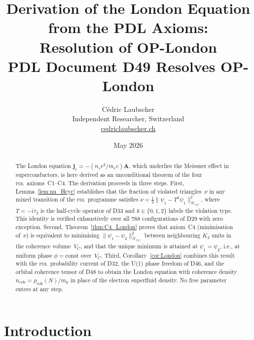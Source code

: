\documentclass[12pt,a4paper]{article}
\newcommand{\Kfour}{K_4}
\newcommand{\PDL}{\textsc{pdl}}
\newcommand{\rhocoh}{\rho_{\mathrm{coh}}}
\newcommand{\Hcyc}{\mathcal{H}_{\mathrm{cyc}}}
\newcommand{\VC}{V_C}
\newcommand{\ncoh}{n_{\mathrm{coh}}}
\newcommand{\jsvec}{\mathbf{j}_s}
\newcommand{\Avec}{\mathbf{A}}
\begin{document}
\title{\textbf{Derivation of the London Equation from the PDL Axioms:\\
Resolution of OP-London}\\[6pt]
{\large PDL Document D49 \textemdash{} Resolves OP-London}}

\author{C\'edric Laubscher\\[4pt]
\small Independent Researcher, Switzerland\\
\small \href{https://cedriclaubscher.ch}{cedriclaubscher.ch}}

\date{May 2026}

\maketitle

\begin{abstract}
The London equation $\jsvec = -(n_s e^2/m_e c)\Avec$, which underlies the Meissner effect in superconductors, is here derived as an unconditional theorem of the four \PDL\ axioms~C1--C4. The derivation proceeds in three steps. First, Lemma~\ref{lem:nu_Hcyc} establishes that the fraction of violated triangles~$\nu$ in any mixed transition of the \PDL\ programme satisfies $\nu = \tfrac{1}{4}\|\psi_1 - T^k\psi_1\|^2_{\Hcyc}$, where $T = -i\tau_2$ is the half-cycle operator of D33 and $k \in \{0,1,2\}$ labels the violation type. This identity is verified exhaustively over all 768 configurations of D29 with zero exception. Second, Theorem~\ref{thm:C4_London} proves that axiom~C4 (minimisation of~$\nu$) is equivalent to minimising $\|\psi_1 - \psi_2\|^2_{\Hcyc}$ between neighbouring $\Kfour{}$ units in the coherence volume~$\VC$, and that the unique minimum is attained at $\psi_1 = \psi_2$, i.e., at uniform phase $\phi = \mathrm{const}$ over~$\VC$. Third, Corollary~\ref{cor:London} combines this result with the \PDL\ probability current of D32, the U(1) phase freedom of D46, and the orbital coherence tensor of D48 to obtain the London equation with coherence density $\ncoh = \rhocoh(N)/m_p$ in place of the electron superfluid density. No free parameter enters at any step.
\end{abstract}

\clearpage

\tableofcontents
\newpage

\section{Introduction}
\label{sec:intro}
\end{document}
